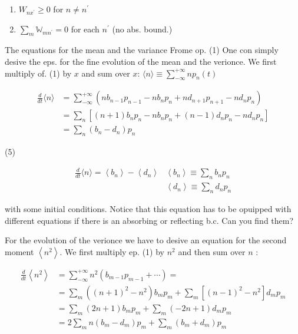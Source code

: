 \begin{enumerate}
  \item $W_{n x^{\prime}} \geqslant 0$ for $n \neq n^{\prime}$
  \item $\sum_{m} \mathbb{W}_{m n^{\prime}}=0$ for each $n^{\prime}$ (no abs. bound.)
\end{enumerate}

The equations for the mean and the variance Frome op. (1) One con simply desive the eps. for the fine evolution of the mean and the verionce. We first multiply of. (1) by $x$ and sum over $x$: $\langle n\rangle \equiv \sum_{-\infty}^{+\infty} n p_{n}(t)$

$$ 
\begin{aligned}
\frac{d}{d t}\langle n\rangle & =\sum_{-\infty}^{+\infty}\left(n b_{n-1} p_{n-1}-n b_{n} p_{n}+n d_{n+1} p_{n+1}-n d_{n} p_{n}\right) \\
& =\sum_{n}\left[(n+1) b_{n} p_{n}-n b_{n} p_{n}+(n-1) d_{n} p_{n}-n d_{n} p_{n}\right] \\
& =\sum_{n}\left(b_{n}-d_{n}\right) p_{n}
\end{aligned}
$$ 

(5)

$$ 
\begin{array}{ll}
\frac{d}{d t}\langle n\rangle=\left\langle b_{n}\right\rangle-\left\langle d_{n}\right\rangle & \left\langle b_{n}\right\rangle \equiv \sum_{n} b_{n} p_{n} \\
 & \left\langle d_{n}\right\rangle \equiv \sum_{n} d_{n} p_{n}
\end{array}
$$ 

with some initial conditions. Notice that this equation has to be opuipped with different equations if there is an absorbing or reflecting b.c. Can you find them?

For the evolution of the verionce we have to desive an equation for the second moment $\left\langle n^{2}\right\rangle$. We first multiply ep. (1) by $n^{2}$ and then sum over $n$ :

$$ 
\begin{aligned}
\frac{d}{d t}\left\langle n^{2}\right\rangle & =\sum_{-\infty}^{+\infty} n^{2}\left(b_{m-1} p_{m-1}+\cdots\right)=\\
& =\sum_{m}\left((n+1)^{2}-n^{2}\right) b_{m} p_{m}+\sum_{m}\left[(n-1)^{2}-n^{2}\right] d_{m} p_{m} \\ & =\sum_{m}(2 n+1) b_{m} p_{m}+\sum_{m}(-2 n+1) d_{m} p_{m} \\ & =2 \sum_{m} n\left(b_{m}-d_{m}\right) p_{m}+\sum_{m}\left(b_{m}+d_{m}\right) p_{m}
\end{aligned}
$$ 

